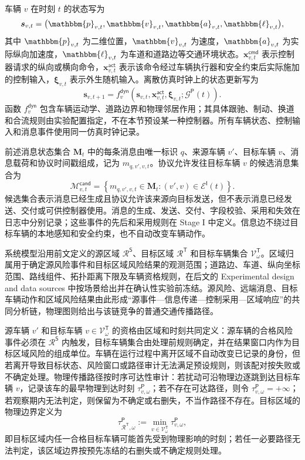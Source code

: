 \documentclass[10pt,a4paper,twocolumn]{article}
\begin{document}
车辆 $v$ 在时刻 $t$ 的状态写为
\begin{equation}
\bm s_{v,t}=\bigl(\mathbbm{p}_{v,t},\mathbbm{v}_{v,t},\mathbbm{a}_{v,t},\mathbbm{\ell}_{v,t}\bigr),
\end{equation}
其中 $\mathbbm{p}_{v,t}$ 为二维位置，$\mathbbm{v}_{v,t}$ 为速度，$\mathbbm{a}_{v,t}$ 为实际纵向加速度，$\mathbbm{\ell}_{v,t}$ 为车道和道路边等交通环境状态。$\bm x_{v,t}^{\mathsf{cmd}}$ 表示控制器请求的纵向或横向命令，$\bm x_{v,t}^{\mathsf{act}}$ 表示该命令经过车辆执行器和安全约束后实际施加的控制输入，$\boldsymbol\xi_{v,t}$ 表示外生随机输入。离散仿真时钟上的状态更新写为
\begin{equation}
\bm s_{v,t+1}=f_v^{\mathsf{dyn}}\!\left(\bm s_{v,t},\bm x_{v,t}^{\mathsf{act}},\boldsymbol\xi_{v,t};\mathcal G^{\mathsf P}(t)\right).
\end{equation}
函数 $f_v^{\mathsf{dyn}}$ 包含车辆运动学、道路边界和物理邻居作用；其具体跟驰、制动、换道和合流规则由实验配置指定，不在本节预设某一种控制器。所有车辆状态、控制输入和消息事件使用同一仿真时钟记录。

前述消息状态集合 $\bm M_t$ 中的每条消息由唯一标识 $q$、来源车辆 $v'$、目标车辆 $v$、消息载荷和协议时间戳组成，记为 $m_{q,v',v,t}$。协议允许发往目标车辆 $v$ 的候选消息集合为
\begin{equation}
\mathcal M_{v,t}^{\mathsf{cand}}=\left\{m_{q,v',v,t}\in \bm M_t:
(v',v)\in\mathcal{E}^{\mathsf I}(t)\right\}.
\end{equation}
候选集合表示消息已经生成且协议允许该来源向目标发送，但不表示消息已经发送、交付或可供控制器使用。消息的生成、发送、交付、字段校验、采用和失效在日志中分别记录；这些事件的先后和采用规则在 Stage I 中定义。信息边不绕过目标车辆的本地感知和安全约束，也不自动改变车辆动作。

系统模型沿用前文定义的源区域 $\mathcal R^{\mathsf S}$、目标区域 $\mathcal R^{\mathsf T}$ 和目标车辆集合 $\mathcal V^{\mathsf T}_{\omega}$。区域归属用于确定源风险事件和目标区域风险结果的观测范围；道路边、车道、纵向坐标范围、路线组件、拓扑距离下限及车辆资格规则，在后文的 Experimental design and data sources 中按场景给出并在确认性实验前冻结。源风险、远端消息、目标车辆动作和区域风险结果由此形成“源事件—信息传递—控制采用—区域响应”的共同分析链，物理图则给出与该链竞争的普通交通传播路径。

源车辆 $v'$ 和目标车辆 $v\in\mathcal V^{\mathsf T}_{\omega}$ 的资格由区域和时刻共同定义：源车辆的合格风险事件必须在 $\mathcal R^{\mathsf S}$ 内触发，目标车辆集合由处理前规则确定，并在结果窗口内作为目标区域风险的组成单位。车辆在运行过程中离开区域不自动改变已记录的身份，但若离开导致目标状态、风险窗口或路径审计无法满足预设规则，则该配对按失败或不确定处理。物理传播路径按时序可达性审计：若扰动可沿物理边逐跳到达目标车辆 $v$，记录该车的最早物理到达时刻 $\tau_{v,\omega}^{\mathsf P}$；若不存在可达路径，则令 $\tau_{v,\omega}^{\mathsf P}=+\infty$；若观察期内无法判定，则保留为不确定或右删失，不当作路径不存在。目标区域的物理边界定义为
\begin{equation*}
\tau_{\mathcal R^{\mathsf T},\omega}^{\mathsf P}
 :=\min_{v\in\mathcal V^{\mathsf T}_{\omega}}\tau_{v,\omega}^{\mathsf P},
\end{equation*}
即目标区域内任一合格目标车辆可能首先受到物理影响的时刻；若任一必要路径无法判定，该区域边界按预先冻结的右删失或不确定规则处理。
\end{document}
